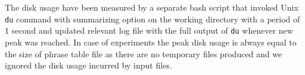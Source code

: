 The disk usage have been measured by a separate bash script that invoked Unix
\texttt{du} command with summarizing option on the working directory with
a period of 1 second and updated relevant log file with the full output of
\texttt{du} whenever new peak was reached.
In case of \eppex{} experiments the peak disk usage is always equal to the
size of phrase table file as there are no temporary files produced and we
ignored the disk usage incurred by input files.
